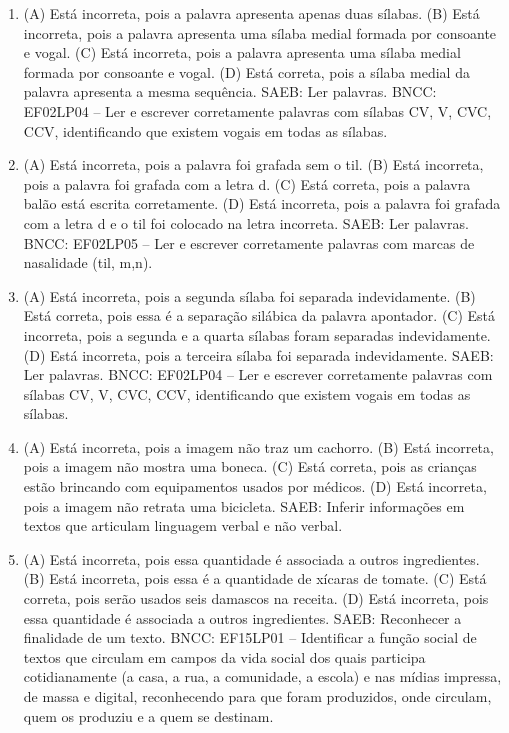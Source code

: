 \begin{enumerate}
\item
(A) Está incorreta, pois a palavra apresenta apenas duas sílabas.
(B) Está incorreta, pois a palavra apresenta uma sílaba medial formada por consoante e vogal.
(C) Está incorreta, pois a palavra apresenta uma sílaba medial formada por consoante e vogal.
(D) Está correta, pois a sílaba medial da palavra apresenta a mesma sequência.
SAEB: Ler palavras.
BNCC: EF02LP04 -- Ler e escrever corretamente palavras com
sílabas CV, V, CVC, CCV, identificando que existem vogais em todas as
sílabas.

\item
(A) Está incorreta, pois a palavra foi grafada sem o til.
(B) Está incorreta, pois a palavra foi grafada com a letra d.
(C) Está correta, pois a palavra balão está escrita corretamente.
(D) Está incorreta, pois a palavra foi grafada com a letra d e o til foi colocado na letra incorreta.
SAEB: Ler palavras.
BNCC: EF02LP05 -- Ler e escrever corretamente palavras com marcas
de nasalidade (til, m,n).

\item
(A) Está incorreta, pois a segunda sílaba foi separada indevidamente.
(B) Está correta, pois essa é a separação silábica da palavra apontador.
(C) Está incorreta, pois a segunda e a quarta sílabas foram separadas indevidamente.
(D) Está incorreta, pois a terceira sílaba foi separada indevidamente.
SAEB: Ler palavras.
BNCC: EF02LP04 -- Ler e escrever corretamente palavras com
sílabas CV, V, CVC, CCV, identificando que existem vogais em todas as
sílabas.

\item
(A) Está incorreta, pois a imagem não traz um cachorro.
(B) Está incorreta, pois a imagem não mostra uma boneca.
(C) Está correta, pois as crianças estão brincando com equipamentos usados por médicos.
(D) Está incorreta, pois a imagem não retrata uma bicicleta.
SAEB: Inferir informações em textos que articulam linguagem verbal e não verbal.

\item
(A) Está incorreta, pois essa quantidade é associada a outros ingredientes.
(B) Está incorreta, pois essa é a quantidade de xícaras de tomate.
(C) Está correta, pois serão usados seis damascos na receita.
(D) Está incorreta, pois essa quantidade é associada a outros ingredientes.
SAEB: Reconhecer a finalidade de um texto.
BNCC: EF15LP01 -- Identificar a função social de textos que
circulam em campos da vida social dos quais participa cotidianamente (a
casa, a rua, a comunidade, a escola) e nas mídias impressa, de massa e
digital, reconhecendo para que foram produzidos, onde circulam, quem os
produziu e a quem se destinam.


\end{enumerate}
